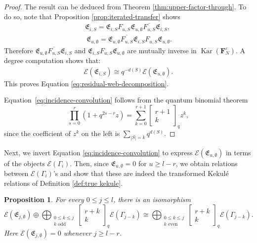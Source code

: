 \documentclass[12pt]{amsart}
\newtheorem{proposition}[theorem]{Proposition}
\theoremstyle{definition}
\theoremstyle{remark}
\numberwithin{equation}{section}
\numberwithin{figure}{section}
\newcommand{\Kar}{\operatorname{Kar}}
\newcommand{\Foam}{\mathbf{F}_N}
\newcommand{\osum}{\bigoplus}
\begin{document}
\begin{proof}
The result can be deduced from Theorem \ref{thm:upper-factor-through}. To do so, note that Proposition \ref{prop:iterated-transfer} shows
\begin{align*}
     \mathfrak{E}_{i,S}= \mathfrak{E}_{i,S}F_{u,S}\mathfrak{E}_{u,\emptyset}\overline{F_{u,S}}\mathfrak{E}_{i,S}, \\\
  \mathfrak{E}_{u,\emptyset}=\mathfrak{E}_{u,\emptyset}\overline{F_{u,S}}\mathfrak{E}_{i,S}F_{u,S}\mathfrak{E}_{u,\emptyset}. 
\end{align*}
Therefore $ \mathfrak{E}_{u,\emptyset} \overline{F_{u,S}}  \mathfrak{E}_{i,S}$ and $\mathfrak{E}_{i,S} F_{u,S} \mathfrak{E}_{u,\emptyset}$ are mutually inverse in $\Kar(\Foam^\varepsilon).$ A degree computation shows that:
\begin{align}\label{eq:isomorphism for fixed S+i}
    \mathcal E(\mathfrak{E}_{i,S}) \cong q^{-d(S)} \mathcal E(\mathfrak{E}_{u ,\emptyset}).
\end{align}
This proves Equation \eqref{eq:residual-web-decomposition}.

Equation~\eqref{eq:incidence-convolution} follows from the quantum binomial theorem
\begin{equation}\label{eq:balanced-q-binomial}
 \prod_{s=0}^{r}\left(1+q^{2s-r}z\right)  =\sum_{k=0}^{r+1}  \begin{bmatrix}r+1\\k\end{bmatrix}_qz^k,
\end{equation}
since the coefficient of $z^k$ on the left is $\sum_{|S|=k}q^{d(S)}$.
\end{proof}

Next, we invert Equation \eqref{eq:incidence-convolution} to express $\mathcal E(\mathfrak{E}_{u,\emptyset})$ in terms of the objects $\mathcal E(\Gamma_i)$. Then, since $\mathfrak{E}_{u,\emptyset} = 0$ for $u \geq l-r$, we obtain relations between $\mathcal E(\Gamma_i)$'s and show that these are indeed the transformed Kekulé relations of Definition \ref{def:true kekule}.

\begin{proposition}\label{lem:karoubi categorification}
For every $0\leq j\leq l$, there is an isomorphism
\begin{equation}\label{eq:inverse-incidence}
 \mathcal E(\mathfrak{E}_{j,\emptyset}) \oplus \osum_{\substack{0\leq k\leq j\\ k\text{ odd}}} \begin{bmatrix}r+k\\k\end{bmatrix}_q \mathcal E(\Gamma_{j-k})
 \cong \osum_{\substack{0\leq k\leq j\\ k\text{ even}}}  \begin{bmatrix}r+k\\k\end{bmatrix}_q \mathcal E(\Gamma_{j-k}).
\end{equation}
Here $\mathcal E(\mathfrak{E}_{j,\emptyset})=0$ whenever $j\geq l-r$.
\end{proposition}
\end{document}
